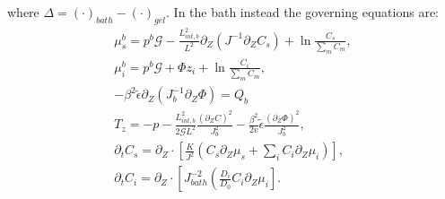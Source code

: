 where $\Delta=(\cdot)_{bath}-(\cdot)_{gel}$.
In the bath instead the governing equations are:
\begin{gather}
\mu^{b}_s = p^b \mathcal{G} - \frac{L^2_{int,b}}{L^2}  \partial_Z (J^{-1} \partial_Z C_s) + \ln \frac{C_s}{\sum_m C_m}, \\
\mu^{b}_i = p^b \mathcal{G}+ \Phi z_i + \ln \frac{C_i}{\sum_m C_m} ,\\
-\beta^2 \tilde{\epsilon} \partial_Z (J_b^{-1}\partial_Z\Phi) = Q_b\, \\[2.5mm]
T_z= -p - \frac{L^2_{int,b}}{2\mathcal{G}L^2} \frac{(\partial_Z C)^2}{J_{b}^2}-\frac{\beta^2}{2v}\tilde{\epsilon} \frac{(\partial_Z \Phi)^2}{J_b^2},\\
\partial_t C_s=\partial_Z \cdot\left[\frac{K}{J^2} \left(C_s\partial_Z \mu_s +\sum_i  C_i \partial_Z \mu_i\right)\right],\\
\partial_t C_i= \partial_Z \cdot\left[ J_{bath}^{-2} \left(\frac{D_i}{D_0}C_i\partial_Z \mu_i\right].
\end{gather}